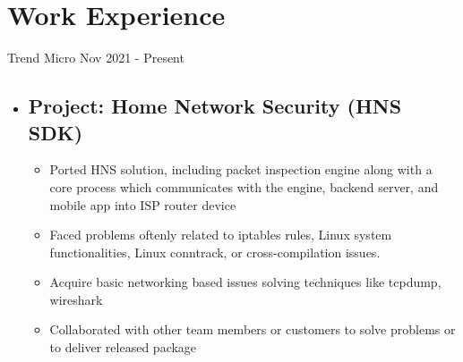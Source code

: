 \section{Work Experience}

{Trend Micro}
{Nov 2021 - Present}
{}

\begin{itemize}
  \item \subsection*{\textbf{Project: Home Network Security (HNS SDK)}}
    \begin{itemize}
        \setlength\topsep{0em}
        \setlength\parskip{0em}
        \setlength\parsep{0em}
        \setlength\itemsep{0em}
      \item Ported HNS solution, including packet inspection engine along with a core process which communicates with the engine, backend server, and mobile app into ISP router device
      \item Faced problems oftenly related to iptables rules, Linux system functionalities, Linux conntrack, or cross-compilation issues.
      \item Acquire basic networking based issues solving techniques like tcpdump, wireshark
      \item Collaborated with other team members or customers to solve problems or to deliver released package
    \end{itemize}
\end{itemize}


